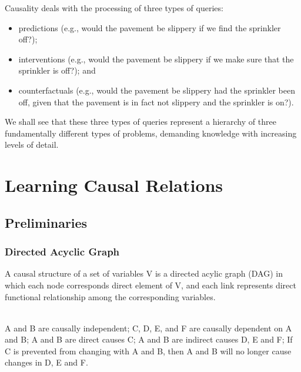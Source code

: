 \documentclass{beamer}
\begin{document}
\begin{frame}
Causality deals with the processing of three types of queries:

\begin{itemize}
\item predictions (e.g., would the pavement be slippery if
we find the sprinkler off?);
\item interventions (e.g., would the pavement be slippery if
we make sure that the sprinkler is off?); and
\item counterfactuals (e.g., would the pavement be slippery
had the sprinkler been off, given that the pavement
is in fact not slippery and the sprinkler is on?).
\end{itemize}

We shall see that these three types of queries represent a
hierarchy of three fundamentally different types of
problems, demanding knowledge with increasing levels of
detail.

\end{frame}




\section{Learning Causal Relations} %

\subsection{Preliminaries}
\begin{frame}
\frametitle{Directed Acyclic Graph}
A causal structure of a set of variables V is a directed acylic graph (DAG) in which each node
corresponds direct element of V, and each link represents direct functional relationship
among the corresponding variables.
\\~\\


A and B are causally independent;
C, D, E, and F are causally dependent on A and B;
A and B are direct causes C;
A and B are indirect causes D, E and F;
If C is prevented from changing with A and B, then A and B will no longer cause changes in D, E and F.
\end{frame}
\end{document}

